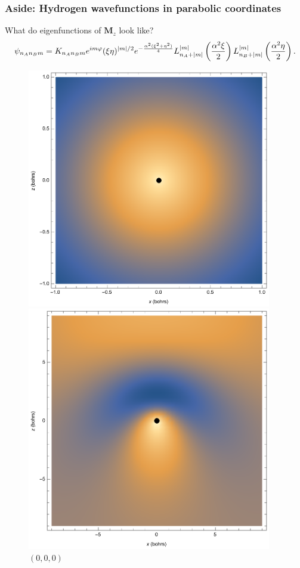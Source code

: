 \documentclass{beamer}
\theoremstyle{definition}
\newcommand{\lp}{\left(}
\newcommand{\rp}{\right)}
\newcommand{\f}[2]{\frac{#1}{#2}}
\newcommand{\al}{\alpha}
\begin{document}
\begin{frame}
\frametitle{Aside: Hydrogen wavefunctions in parabolic coordinates}

What do eigenfunctions of $\mathbf{M}_z$ look like? 
\begin{align*}
\psi_{n_A n_B m} = K_{n_An_B m} e^{im\varphi} (\xi \eta)^{\abs{m}/2}  e^{ -\f{\al^2(\xi^2 + \eta^2)}{4}}
L_{n_A + \abs{m}}^{\abs{m}} \lp\f{\al^2 \xi}{2} \rp
L_{n_B + \abs{m}}^{\abs{m}} \lp\f{\al^2 \eta}{2} \rp.
\end{align*}


\begin{figure}[!htb]
\begin{minipage}{0.24\textwidth}
\includegraphics[width=0.95\textwidth]{figures/000.eps}
\caption*{$(0,0,0)$}
\end{minipage}
\begin{minipage}{0.24\textwidth}
\includegraphics[width=0.95\textwidth]{figures/200.eps}

\end{minipage}
\end{figure}
\end{frame}
\end{document}
